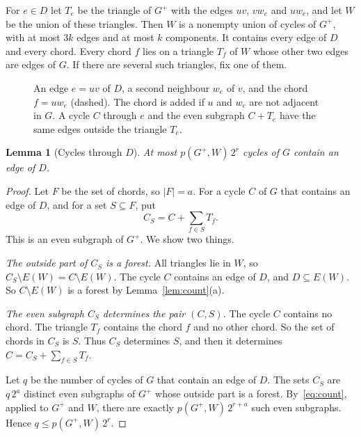 \documentclass[11pt]{article}
\newtheorem{lemma}[theorem]{Lemma}
\theoremstyle{definition}
\theoremstyle{remark}
\newcommand{\sm}{\setminus}
\numberwithin{equation}{section}
\begin{document}
For $e\in D$ let $T_e$ be the triangle of $G^{+}$ with the edges $uv$, $vw_e$ and $uw_e$, and let
$W$ be the union of these triangles. Then $W$ is a nonempty union of cycles of $G^{+}$, with at most
$3k$ edges and at most $k$ components. It contains every edge of $D$ and every chord. Every chord
$f$ lies on a triangle $T_f$ of $W$ whose other two edges are edges of $G$. If there are several
such triangles, fix one of them.

\begin{figure}[ht]
\centering
{}
\caption{An edge $e=uv$ of $D$, a second neighbour $w_e$ of $v$, and the chord $f=uw_e$ (dashed).
The chord is added if $u$ and $w_e$ are not adjacent in $G$. A cycle $C$ through $e$ and the even
subgraph $C+T_e$ have the same edges outside the triangle $T_e$.}
\label{fig:chord}
\end{figure}

\begin{lemma}[Cycles through $D$]\label{lem:through}
At most $p(G^{+},W)\,2^{r}$ cycles of $G$ contain an edge of $D$.
\end{lemma}

\begin{proof}
Let $F$ be the set of chords, so $|F|=a$. For a cycle $C$ of $G$ that contains an edge of $D$, and
for a set $S\subseteq F$, put
\[
  C_S=C+\sum_{f\in S}T_f .
\]
This is an even subgraph of $G^{+}$. We show two things.

\emph{The outside part of $C_S$ is a forest.} All triangles lie in $W$, so
$C_S\sm E(W)=C\sm E(W)$. The cycle $C$ contains an edge of $D$, and $D\subseteq E(W)$. So
$C\sm E(W)$ is a forest by Lemma~\ref{lem:count}(a).

\emph{The even subgraph $C_S$ determines the pair $(C,S)$.} The cycle $C$ contains no chord. The
triangle $T_f$ contains the chord $f$ and no other chord. So the set of chords in $C_S$ is $S$. Thus
$C_S$ determines $S$, and then it determines $C=C_S+\sum_{f\in S}T_f$.

Let $q$ be the number of cycles of $G$ that contain an edge of $D$. The sets $C_S$ are $q\,2^{a}$
distinct even subgraphs of $G^{+}$ whose outside part is a forest. By~\eqref{eq:count}, applied to
$G^{+}$ and $W$, there are exactly $p(G^{+},W)\,2^{r+a}$ such even subgraphs. Hence
$q\le p(G^{+},W)\,2^{r}$.
\end{proof}
\end{document}
